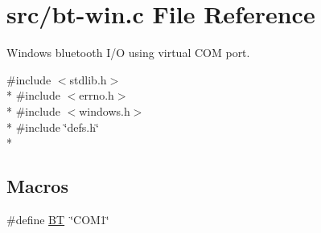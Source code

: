 \hypertarget{bt-win_8c}{}\section{src/bt-\/win.c File Reference}
\label{bt-win_8c}


Windows bluetooth I/\+O using virtual C\+O\+M port.  


{\ttfamily \#include $<$stdlib.\+h$>$}\\*
{\ttfamily \#include $<$errno.\+h$>$}\\*
{\ttfamily \#include $<$windows.\+h$>$}\\*
{\ttfamily \#include \char`\"{}defs.\+h\char`\"{}}\\*
\subsection*{Macros}
\begin{DoxyCompactItemize}
\item 
\#define \hyperlink{bt-win_8c_a9ed5212b4acf61bb0f7b9b9078ba67ae}{B\+T}~\char`\"{}C\+O\+M1\char`\"{}
\end{DoxyCompactItemize}
